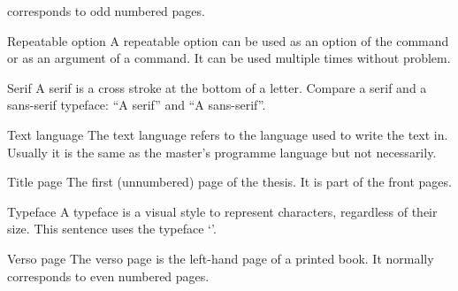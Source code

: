 \begin{termlist}
  corresponds to odd numbered pages.
\item[Repeatable option \latex]
  A repeatable option can be used as an option of the 
  command or as an argument of a  command. It can be used
  multiple times without problem.
\item[Serif]
  A serif is a cross stroke at the bottom of a letter. Compare a serif and
  a sans-serif typeface: ``{\selectfont A serif}'' and
  ``{\selectfont A sans-serif}''.
\item[Text language]
  The text language refers to the language used to write the text in.
  Usually it is the same as the master's programme language but not necessarily.
\item[Title page]
  The first (unnumbered) page of the thesis. It is part of the front pages.
\item[Typeface]
  A typeface is a visual style to represent characters, regardless of their
  size. This sentence uses the typeface `\rmfontname'. 
\item[Verso page]
  The verso page is the left-hand page of a printed book. It normally
  corresponds to even numbered pages.
\end{termlist}


